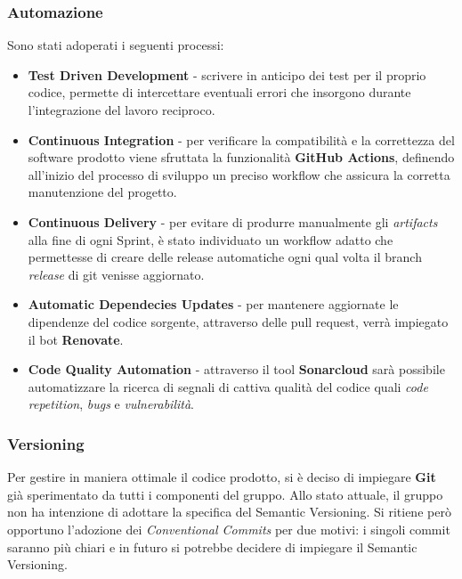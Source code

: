 \subsubsection{Automazione}
Sono stati adoperati i seguenti processi:
\begin{itemize}
    \item \textbf{Test Driven Development} - scrivere in anticipo dei test per il proprio codice,
    permette di intercettare eventuali errori che insorgono durante l'integrazione del lavoro reciproco.
    \item \textbf{Continuous Integration} - per verificare la compatibilità e la correttezza del software prodotto
    viene sfruttata la funzionalità \textbf{GitHub Actions}, definendo all'inizio del processo di sviluppo un
    preciso workflow che assicura la corretta manutenzione del progetto.
    \item \textbf{Continuous Delivery} - per evitare di produrre manualmente gli \textit{artifacts}
    alla fine di ogni Sprint, è stato individuato un workflow adatto che permettesse di creare delle
    release automatiche ogni qual volta il branch \textit{release} di git venisse aggiornato.
    \item \textbf{Automatic Dependecies Updates} - per mantenere aggiornate le dipendenze del codice sorgente, attraverso
    delle pull request, verrà impiegato il bot \textbf{Renovate}.
    \item \textbf{Code Quality Automation} - attraverso il tool \textbf{Sonarcloud} sarà possibile automatizzare la ricerca
    di segnali di cattiva qualità del codice quali \textit{code repetition}, \textit{bugs} e \textit{vulnerabilità}.
\end{itemize}

\subsubsection{Versioning}
Per gestire in maniera ottimale il codice prodotto, si è deciso di impiegare \textbf{Git} già sperimentato da tutti i
componenti del gruppo. Allo stato attuale, il gruppo non ha intenzione di adottare la specifica del Semantic Versioning.
Si ritiene però opportuno l'adozione dei \textit{Conventional Commits} per due motivi: i singoli commit saranno più chiari
e in futuro si potrebbe decidere di impiegare il Semantic Versioning.

